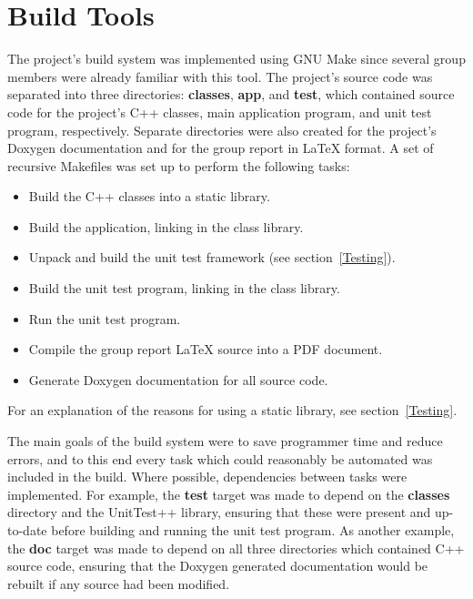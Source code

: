\section{Build Tools}
\label{Build Tools}
The project's build system was implemented using GNU Make since several group members were already familiar with this tool.  The project's source code was separated into three directories: \textbf{classes}, \textbf{app}, and \textbf{test}, which contained source code for the project's C++ classes, main application program, and unit test program, respectively.  Separate directories were also created for the project's Doxygen documentation and for the group report in LaTeX format.  A set of recursive Makefiles was set up to perform the following tasks:

\begin{itemize}

  \item Build the C++ classes into a static library.
  \item Build the application, linking in the class library.
  \item Unpack and build the unit test framework (see section~\ref{Testing}).
  \item Build the unit test program, linking in the class library.
  \item Run the unit test program.
  \item Compile the group report LaTeX source into a PDF document.
  \item Generate Doxygen documentation for all source code.

\end{itemize}

For an explanation of the reasons for using a static library, see section~\ref{Testing}.  

The main goals of the build system were to save programmer time and reduce errors, and to this end every task which could reasonably be automated was included in the build.  Where possible, dependencies between tasks were implemented.  For example, the \textbf{test} target was made to depend on the \textbf{classes} directory and the UnitTest++ library, ensuring that these were present and up-to-date before building and running the unit test program.  As another example, the \textbf{doc} target was made to depend on all three directories which contained C++ source code, ensuring that the Doxygen generated documentation would be rebuilt if any source had been modified.

